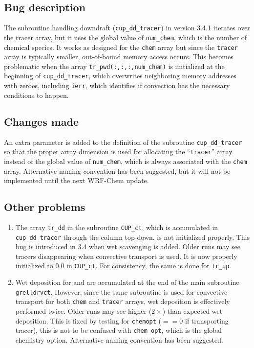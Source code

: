 \subsection{Bug description}\label{a-ssec:bug/ctrans/bug}
	The subroutine handling downdraft (\texttt{cup\_dd\_tracer}) in version 3.4.1 iterates over the tracer array, but it uses the global value of \texttt{num\_chem}, which is the number of chemical species. It works as designed for the \texttt{chem} array but since the \texttt{tracer} array is typically smaller, out-of-bound memory access occurs. This becomes problematic when the array \texttt{tr\_pwd(:,:,:,num\_chem)} is initialized at the beginning of \texttt{cup\_dd\_tracer}, which overwrites neighboring memory addresses with zeroes, including \texttt{ierr}, which identifies if convection has the necessary conditions to happen.

\subsection{Changes made}\label{a-ssec:bug/ctrans/fix}
	An extra parameter is added to the definition of the subroutine \texttt{cup\_dd\_tracer} so that the proper array dimension is used for allocating the ``\texttt{tracer}'' array instead of the global value of \texttt{num\_chem}, which is always associated with the \texttt{chem} array. Alternative naming convention has been suggested, but it will not be implemented until the next WRF-Chem update.

\subsection{Other problems}\label{a-ssec:bug/ctrans/misc}
	\begin{enumerate}
		\item The array \texttt{tr\_dd} in the subroutine \texttt{CUP\_ct}, which is accumulated in \texttt{cup\_dd\_tracer} through the column top-down, is not initialized properly. This bug is introduced in 3.4 when wet scavenging is added. Older runs may see tracers disappearing when convective transport is used. It is now properly initialized to $0.0$ in \texttt{CUP\_ct}. For consistency, the same is done for \texttt{tr\_up}.
		\item Wet deposition for  and  are accumulated at the end of the main subroutine \texttt{grelldrvct}. However, since the same subroutine is used for convective transport for both \texttt{chem} and \texttt{tracer} arrays, wet deposition is effectively performed twice. Older runs may see higher ($2\times$) than expected wet deposition. This is fixed by testing for \texttt{chemopt} ($==0$ if transporting tracer), this is not to be confused with \texttt{chem\_opt}, which is the global chemistry option. Alternative naming convention has been suggested.
	\end{enumerate}
